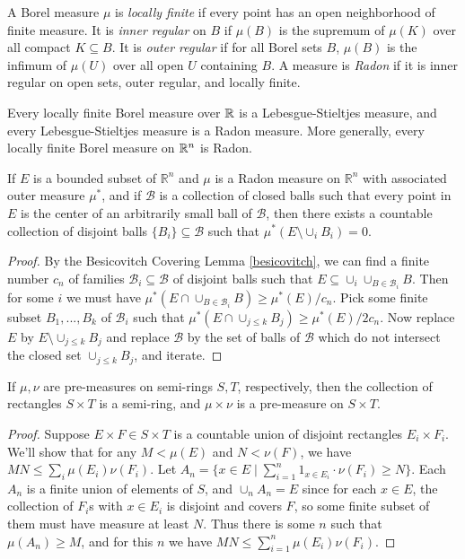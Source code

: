 \begin{defn} A Borel measure $\mu$ is \emph{locally finite} if every point has an open neighborhood of finite measure. It is \emph{inner regular} on $B$ if $\mu(B)$ is the supremum of $\mu(K)$ over all compact $K \subseteq B$. It is \emph{outer regular} if for all Borel sets $B$, $\mu(B)$ is the infimum of $\mu(U)$ over all open $U$ containing $B$. A measure is \emph{Radon} if it is inner regular on open sets, outer regular, and locally finite.
\end{defn}

\begin{prop} Every locally finite Borel measure over $\mathbb{R}$ is a Lebesgue-Stieltjes measure, and every Lebesgue-Stieltjes measure is a Radon measure. More generally, every locally finite Borel measure on $\mathbb{R}^n$ is Radon.
\end{prop}

\begin{thm}\label{besicovitch-radon} If $E$ is a bounded subset of $\mathbb{R}^n$ and $\mu$ is a Radon measure on $\mathbb{R}^n$ with associated outer measure $\mu^*$, and if $\mathcal{B}$ is a collection of closed balls such that every point in $E$ is the center of an arbitrarily small ball of $\mathcal{B}$, then there exists a countable collection of disjoint balls $\{B_i\} \subseteq \mathcal{B}$ such that $\mu^*(E\setminus \cup_i B_i) = 0$.
\end{thm}
\begin{proof} By the Besicovitch Covering Lemma \ref{besicovitch}, we can find a finite number $c_n$ of families $\mathcal{B}_i \subseteq \mathcal{B}$ of disjoint balls such that $E \subseteq \cup_i \cup_{B \in \mathcal{B}_i} B$. Then for some $i$ we must have $\mu^*(E\cap \cup_{B\in \mathcal{B}_i}B) \ge \mu^*(E)/c_n$. Pick some finite subset $B_1, ..., B_k$ of $\mathcal{B}_i$ such that $\mu^*(E\cap \cup_{j\le k} B_j) \ge \mu^*(E)/2c_n$. Now replace $E$ by $E\setminus \cup_{j \le k} B_j$ and replace $\mathcal{B}$ by the set of balls of $\mathcal{B}$ which do not intersect the closed set $\cup_{j \le k} B_j$, and iterate.
\end{proof}

\begin{thm}\label{product-measure} If $\mu, \nu$ are pre-measures on semi-rings $S,T$, respectively, then the collection of rectangles $S\times T$ is a semi-ring, and $\mu\times \nu$ is a pre-measure on $S\times T$.
\end{thm}
\begin{proof} Suppose $E\times F \in S\times T$ is a countable union of disjoint rectangles $E_i \times F_i$. We'll show that for any $M < \mu(E)$ and $N < \nu(F)$, we have $MN \le \sum_i \mu(E_i)\nu(F_i)$. Let $A_n = \{x \in E \mid \sum_{i=1}^n 1_{x \in E_i}\cdot\nu(F_i) \ge N\}$. Each $A_n$ is a finite union of elements of $S$, and $\cup_n A_n = E$ since for each $x \in E$, the collection of $F_i$s with $x \in E_i$ is disjoint and covers $F$, so some finite subset of them must have measure at least $N$. Thus there is some $n$ such that $\mu(A_n) \ge M$, and for this $n$ we have $MN \le \sum_{i=1}^n \mu(E_i)\nu(F_i)$.
\end{proof}

